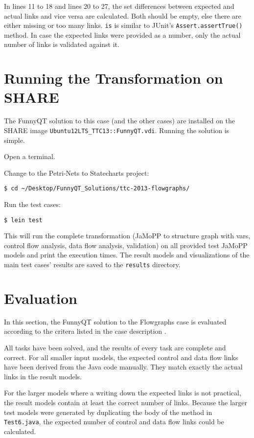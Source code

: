 \documentclass[11pt]{article}
\begin{document}
In lines 11 to 18 and lines 20 to 27, the set differences between expected and
actual links and vice versa are calculated.  Both should be empty, else there
are either missing or too many links.  \verb|is| is similar to JUnit's
\verb|Assert.assertTrue()| method.  In case the expected links were provided as
a number, only the actual number of links is validated against it.


\section{Running the Transformation on SHARE}
\label{sec:run-transformation}

The FunnyQT solution to this case (and the other cases) are installed on the
SHARE image \verb|Ubuntu12LTS_TTC13::FunnyQT.vdi|.  Running the solution is
simple.

\begin{compactenum}
\item Open a terminal.
\item Change to the Petri-Nets to Statecharts project:

  \verb|$ cd ~/Desktop/FunnyQT_Solutions/ttc-2013-flowgraphs/|
\item Run the test cases:

  \verb|$ lein test|
\end{compactenum}

This will run the complete transformation (JaMoPP to structure graph with vars,
control flow analysis, data flow analysis, validation) on all provided test
JaMoPP models and print the execution times.  The result models and
visualizations of the main test cases' results are saved to the \verb|results|
directory.


\section{Evaluation}
\label{sec:evaluation}


In this section, the FunnyQT solution to the Flowgraphs case is evaluated
according to the critera listed in the case description
\cite{flowgraphcasedesc}.

All tasks have been solved, and the results of every task are complete and
correct.  For all smaller input models, the expected control and data flow
links have been derived from the Java code manually.  They match exactly the
actual links in the result models.

For the larger models where a writing down the expected links is not practical,
the result models contain at least the correct number of links.  Because the
larger test models were generated by duplicating the body of the method in
\verb|Test6.java|, the expected number of control and data flow links could be
calculated.
\end{document}
